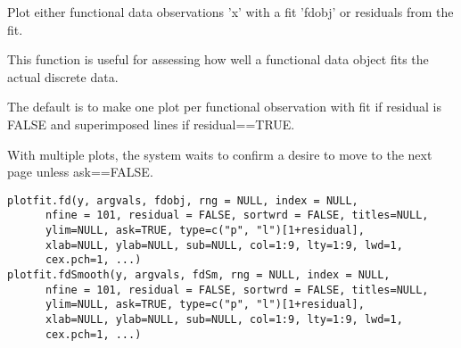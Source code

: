 \documentclass{article}
\begin{document}
\begin{Description}\relax
Plot either functional data observations 'x' with a fit 'fdobj' or
residuals from the fit. 

This function is useful for assessing how well a functional data
object fits the actual discrete data.

The default is to make one plot per functional observation with fit
if residual is FALSE and superimposed lines if residual==TRUE.  

With multiple plots, the system waits to confirm a desire to move to
the next page unless ask==FALSE.
\end{Description}
\begin{Usage}
\begin{verbatim}
plotfit.fd(y, argvals, fdobj, rng = NULL, index = NULL,
      nfine = 101, residual = FALSE, sortwrd = FALSE, titles=NULL,
      ylim=NULL, ask=TRUE, type=c("p", "l")[1+residual],
      xlab=NULL, ylab=NULL, sub=NULL, col=1:9, lty=1:9, lwd=1,
      cex.pch=1, ...)
plotfit.fdSmooth(y, argvals, fdSm, rng = NULL, index = NULL,
      nfine = 101, residual = FALSE, sortwrd = FALSE, titles=NULL,
      ylim=NULL, ask=TRUE, type=c("p", "l")[1+residual],
      xlab=NULL, ylab=NULL, sub=NULL, col=1:9, lty=1:9, lwd=1,
      cex.pch=1, ...) 
\end{verbatim}
\end{Usage}
\end{document}
